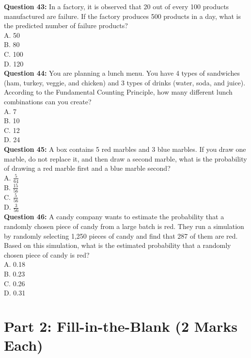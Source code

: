 \documentclass{article}
\begin{document}
\textbf{Question 43:} In a factory, it is observed that 20 out of every 100 products manufactured are failure. If the factory produces 500 products in a day, what is the predicted number of failure products? \\
A. 50 \\
B. 80 \\
C. 100 \\
D. 120 \\

\textbf{Question 44:} You are planning a lunch menu. You have 4 types of sandwiches (ham, turkey, veggie, and chicken) and 3 types of drinks (water, soda, and juice). According to the Fundamental Counting Principle, how many different lunch combinations can you create? \\
A. 7 \\
B. 10 \\
C. 12 \\
D. 24 \\

\textbf{Question 45:} A box contains 5 red marbles and 3 blue marbles. If you draw one marble, do not replace it, and then draw a second marble, what is the probability of drawing a red marble first and a blue marble second? \\
A. $\frac{5}{64}$ \\
B. $\frac{15}{56}$ \\
C. $\frac{5}{56}$ \\
D. $\frac{3}{56}$ \\

\textbf{Question 46:} A candy company wants to estimate the probability that a randomly chosen piece of candy from a large batch is red. They run a simulation by randomly selecting 1,250 pieces of candy and find that 287 of them are red. Based on this simulation, what is the estimated probability that a randomly chosen piece of candy is red? \\
A. 0.18 \\
B. 0.23 \\
C. 0.26 \\
D. 0.31 \\


\section*{Part 2: Fill-in-the-Blank (2 Marks Each)}
\end{document}
